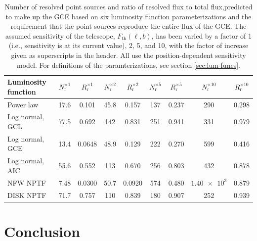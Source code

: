 \documentclass[a4paper,11pt]{article}
\newcommand{\comment}[1]{\emph{\color{red}{#1}}}
\begin{document}
\begin{table}
    \centering
    \begin{tabular}{|l | c c | c c | c c | c c |}
        \hline
        Luminosity function & $N_\text{r}^{\times 1}$ & $R_\text{r}^{\times 1}$ & $N_\text{r}^{\times 2}$ & $R_\text{r}^{\times 2}$ & $N_\text{r}^{\times 5}$ & $R_\text{r}^{\times 5}$ & $N_\text{r}^{\times 10}$ & $R_\text{r}^{\times 10}$\\ \hline \hline
        Power law & 17.6 & 0.101 & 45.8 & 0.157 & 137 & 0.237 & 290 & 0.298 \\
        Log normal, GCL & 77.5 & 0.692 & 142 & 0.831 & 251 & 0.941 & 331 & 0.979 \\
        Log normal, GCE & 13.4 & 0.0648 & 48.9 & 0.129 & 222 & 0.270 & 599 & 0.416  \\
        Log normal, AIC & 55.6 & 0.552 & 113 & 0.670 & 256 & 0.803 & 432 & 0.878  \\
        NFW NPTF & 7.48 & 0.0300 & 50.7 & 0.0920 & 574 & 0.480 & $\num{1.40e3}$ & 0.879 \\
        DISK NPTF & 71.7 & 0.757 & 110 & 0.839 & 180 & 0.907 & 252 & 0.939 \\
        \hline
    \end{tabular}
    \caption{Number of resolved point sources and ratio of resolved flux to total flux,predicted to make up the GCE based on six luminosity function parameterizations and the requirement that the point sources reproduce the entire flux of the GCE. The assumed sensitivity of the telescope, $F_\text{th}(\ell, b)$, has been varied by a factor of 1 (i.e., sensitivity is at its current value), 2, 5, and 10, with the factor of increase given as superscripts in the header. All use the position-dependent sensitivity model. For definitions of the paramterizations, see section \ref{sec:lum-funcs}. \comment{Maybe this should be a plot.}}
    \label{tab:sensitivity-values}
\end{table}


\section{Conclusion}



\appendix
\end{document}
